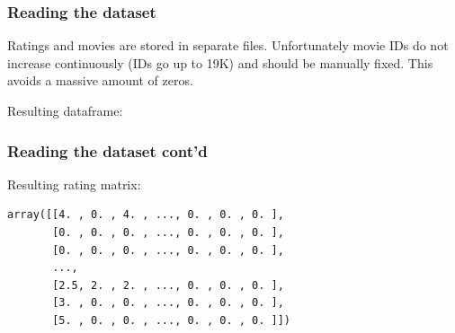 \documentclass[xcolor = {table}]{beamer}
\begin{document}
  \begin{frame}
    \frametitle{Reading the dataset}

    Ratings and movies are stored in separate files. Unfortunately movie IDs do not increase continuously (IDs go up to 19K) and should be manually fixed. This avoids a massive amount of zeros. \\

    \vspace{1em}

    \pause

    Resulting dataframe:

    \begin{center}
    \end{center}

  \end{frame}



  \begin{frame}[fragile]
    \frametitle{Reading the dataset cont'd}

    Resulting rating matrix:

    \vspace{1em}

    \begin{lstlisting}
array([[4. , 0. , 4. , ..., 0. , 0. , 0. ],
       [0. , 0. , 0. , ..., 0. , 0. , 0. ],
       [0. , 0. , 0. , ..., 0. , 0. , 0. ],
       ...,
       [2.5, 2. , 2. , ..., 0. , 0. , 0. ],
       [3. , 0. , 0. , ..., 0. , 0. , 0. ],
       [5. , 0. , 0. , ..., 0. , 0. , 0. ]])
     \end{lstlisting}

  \end{frame}
\end{document}

